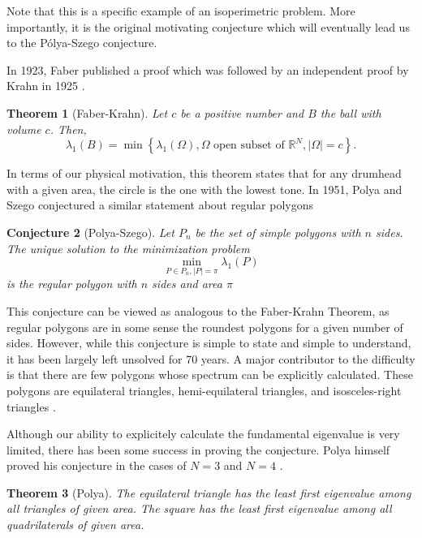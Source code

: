 \documentclass[12pt]{report}
\newtheorem{theorem}{Theorem}[section]
\newtheorem{conjecture}[theorem]{Conjecture}
\numberwithin{definition}{section}
\begin{document}
Note that this is a specific example of an isoperimetric problem.
More importantly, it is the original motivating conjecture which will eventually lead us to the Pólya-Szego conjecture.

In 1923, Faber published a proof which was followed by an independent proof by Krahn in 1925 \cite{krahn}.
\begin{theorem}[Faber-Krahn]
 Let $c$ be a positive number and $B$ the ball with volume $c$. Then,
 \[
   \lambda_{1}(B) = \min \left\{ \lambda_{1}(\Omega), \Omega \text{ open subset of } \mathbb{R}^{N}, |\Omega| = c \right\} 
 .\] 
\end{theorem}
In terms of our physical motivation, this theorem states that for any drumhead with a given area, the circle is the one with the lowest tone.
In 1951, Polya and Szego conjectured a similar statement about regular polygons\cite{polya}

\begin{conjecture}[Polya-Szego]
Let $P_{n}$ be the set of simple polygons with $n$ sides.
The unique solution to the minimization problem
$$
\min_{P \in P_{n},|P|=\pi} \lambda_{1} (P)
$$
is the regular polygon with $n$ sides and area $\pi$
\end{conjecture}

This conjecture can be viewed as analogous to the Faber-Krahn Theorem, as regular polygons are in some sense the roundest polygons for a given number of sides.
However, while this conjecture is simple to state and simple to understand, it has been largely left unsolved for 70 years.
A major contributor to the difficulty is that there are few polygons whose spectrum can be explicitly calculated.
These polygons are equilateral triangles, hemi-equilateral triangles, and isosceles-right triangles \cite{calculate}.


Although our ability to explicitely calculate the fundamental eigenvalue is very limited, there has been some success in proving the conjecture.
Polya himself proved his conjecture in the cases of $N = 3$ and $N = 4$ \cite{henrot}.

\begin{theorem}[Polya]
The equilateral triangle has the least first eigenvalue among all triangles of given area.
The square has the least first eigenvalue among all quadrilaterals of given area.
\end{theorem}
\end{document}
